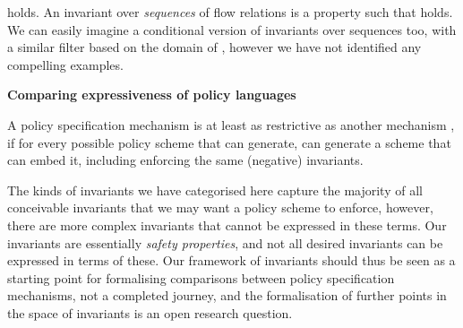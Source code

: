 holds.  An invariant over \emph{sequences} of flow relations is a property  such that
 holds. We can easily imagine a conditional version of invariants over sequences too, with a similar filter
based on the domain of , however we have not identified any compelling examples.

\begin{framed}
\centerline{\bf Comparing expressiveness of policy languages}
\noindent
A policy specification mechanism  is at least as restrictive
as another mechanism , if for every possible policy scheme that  can generate,
 can generate a scheme that can embed it, including enforcing the same (negative)
invariants.
\end{framed}


The kinds of invariants we have categorised here capture the majority of all conceivable invariants
that we may want a policy scheme to enforce, however, there are more complex invariants that
cannot be expressed in these terms. Our invariants are essentially \emph{safety properties}, 
and not all desired invariants can be expressed in terms of these. 
Our framework of invariants should thus be seen as a starting point for
formalising comparisons between policy specification mechanisms, not a completed journey,
and the formalisation of further points in the space of invariants is an open research question.

























